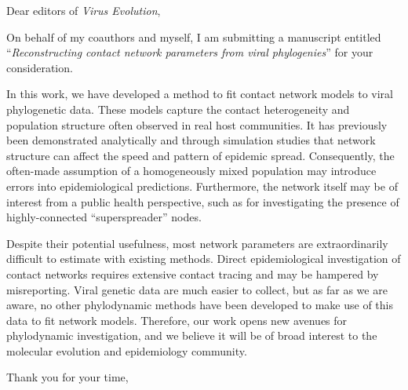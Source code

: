 \documentclass[12pt]{letter}
\begin{document}
\begin{letter}{ }

\opening{Dear editors of \textit{Virus Evolution},}

On behalf of my coauthors and myself, I am submitting a manuscript entitled
``\textit{Reconstructing contact network parameters from viral phylogenies}''
for your consideration. 

In this work, we have developed a method to fit contact network models to viral
phylogenetic data. These models capture the contact heterogeneity and
population structure often observed in real host communities. It has previously
been demonstrated analytically and through simulation studies that network
structure can affect the speed and pattern of epidemic spread. Consequently,
the often-made assumption of a homogeneously mixed population may introduce
errors into epidemiological predictions. Furthermore, the network itself may be
of interest from a public health perspective, such as for investigating the
presence of highly-connected ``superspreader'' nodes.

Despite their potential usefulness, most network parameters are extraordinarily
difficult to estimate with existing methods. Direct epidemiological
investigation of contact networks requires extensive contact tracing and may be
hampered by misreporting. Viral genetic data are much easier to collect, but as
far as we are aware, no other phylodynamic methods have been developed to make
use of this data to fit network models. Therefore, our work opens new avenues
for phylodynamic investigation, and we believe it will be of broad interest to
the molecular evolution and epidemiology community.

\closing{Thank you for your time,}
\end{letter}
\end{document}
